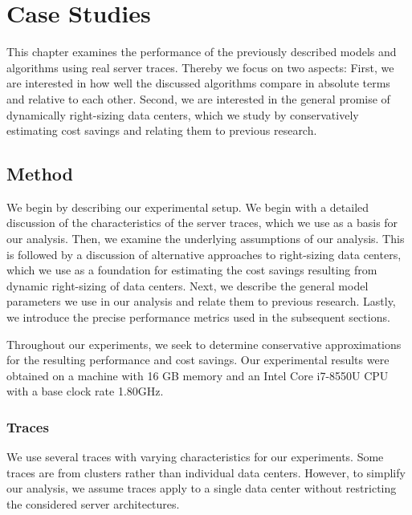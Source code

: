 
\chapter{Case Studies}\label{chapter:case_studies}

This chapter examines the performance of the previously described models and algorithms using real server traces. Thereby we focus on two aspects: First, we are interested in how well the discussed algorithms compare in absolute terms and relative to each other. Second, we are interested in the general promise of dynamically right-sizing data centers, which we study by conservatively estimating cost savings and relating them to previous research.

\section{Method}

We begin by describing our experimental setup. We begin with a detailed discussion of the characteristics of the server traces, which we use as a basis for our analysis. Then, we examine the underlying assumptions of our analysis. This is followed by a discussion of alternative approaches to right-sizing data centers, which we use as a foundation for estimating the cost savings resulting from dynamic right-sizing of data centers. Next, we describe the general model parameters we use in our analysis and relate them to previous research. Lastly, we introduce the precise performance metrics used in the subsequent sections.

Throughout our experiments, we seek to determine conservative approximations for the resulting performance and cost savings. Our experimental results were obtained on a machine with 16 GB memory and an Intel Core i7-8550U CPU with a base clock rate 1.80GHz.

\subsection{Traces}\label{section:case_studies:method:traces}

We use several traces with varying characteristics for our experiments. Some traces are from clusters rather than individual data centers. However, to simplify our analysis, we assume traces apply to a single data center without restricting the considered server architectures.

